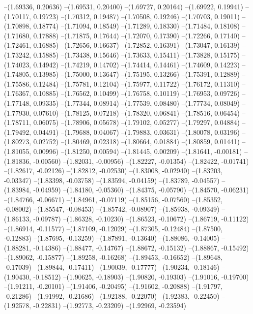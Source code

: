 --(1.69336, 0.20636)
--(1.69531, 0.20400)
--(1.69727, 0.20164)
--(1.69922, 0.19941)
--(1.70117, 0.19723)
--(1.70312, 0.19487)
--(1.70508, 0.19246)
--(1.70703, 0.19011)
--(1.70898, 0.18774)
--(1.71094, 0.18549)
--(1.71289, 0.18330)
--(1.71484, 0.18108)
--(1.71680, 0.17888)
--(1.71875, 0.17644)
--(1.72070, 0.17390)
--(1.72266, 0.17140)
--(1.72461, 0.16885)
--(1.72656, 0.16637)
--(1.72852, 0.16391)
--(1.73047, 0.16139)
--(1.73242, 0.15885)
--(1.73438, 0.15646)
--(1.73633, 0.15411)
--(1.73828, 0.15175)
--(1.74023, 0.14942)
--(1.74219, 0.14702)
--(1.74414, 0.14461)
--(1.74609, 0.14223)
--(1.74805, 0.13985)
--(1.75000, 0.13647)
--(1.75195, 0.13266)
--(1.75391, 0.12889)
--(1.75586, 0.12484)
--(1.75781, 0.12104)
--(1.75977, 0.11722)
--(1.76172, 0.11310)
--(1.76367, 0.10885)
--(1.76562, 0.10499)
--(1.76758, 0.10119)
--(1.76953, 0.09726)
--(1.77148, 0.09335)
--(1.77344, 0.08914)
--(1.77539, 0.08480)
--(1.77734, 0.08049)
--(1.77930, 0.07610)
--(1.78125, 0.07218)
--(1.78320, 0.06841)
--(1.78516, 0.06454)
--(1.78711, 0.06075)
--(1.78906, 0.05678)
--(1.79102, 0.05277)
--(1.79297, 0.04884)
--(1.79492, 0.04491)
--(1.79688, 0.04067)
--(1.79883, 0.03631)
--(1.80078, 0.03196)
--(1.80273, 0.02752)
--(1.80469, 0.02318)
--(1.80664, 0.01884)
--(1.80859, 0.01441)
--(1.81055, 0.00996)
--(1.81250, 0.00594)
--(1.81445, 0.00209)
--(1.81641, -0.00181)
--(1.81836, -0.00560)
--(1.82031, -0.00956)
--(1.82227, -0.01354)
--(1.82422, -0.01741)
--(1.82617, -0.02126)
--(1.82812, -0.02530)
--(1.83008, -0.02940)
--(1.83203, -0.03347)
--(1.83398, -0.03758)
--(1.83594, -0.04159)
--(1.83789, -0.04557)
--(1.83984, -0.04959)
--(1.84180, -0.05360)
--(1.84375, -0.05790)
--(1.84570, -0.06231)
--(1.84766, -0.06671)
--(1.84961, -0.07119)
--(1.85156, -0.07560)
--(1.85352, -0.08002)
--(1.85547, -0.08453)
--(1.85742, -0.08907)
--(1.85938, -0.09349)
--(1.86133, -0.09787)
--(1.86328, -0.10230)
--(1.86523, -0.10672)
--(1.86719, -0.11122)
--(1.86914, -0.11577)
--(1.87109, -0.12029)
--(1.87305, -0.12484)
--(1.87500, -0.12883)
--(1.87695, -0.13259)
--(1.87891, -0.13640)
--(1.88086, -0.14005)
--(1.88281, -0.14386)
--(1.88477, -0.14767)
--(1.88672, -0.15132)
--(1.88867, -0.15492)
--(1.89062, -0.15877)
--(1.89258, -0.16268)
--(1.89453, -0.16652)
--(1.89648, -0.17039)
--(1.89844, -0.17411)
--(1.90039, -0.17777)
--(1.90234, -0.18146)
--(1.90430, -0.18512)
--(1.90625, -0.18903)
--(1.90820, -0.19303)
--(1.91016, -0.19700)
--(1.91211, -0.20101)
--(1.91406, -0.20495)
--(1.91602, -0.20888)
--(1.91797, -0.21286)
--(1.91992, -0.21686)
--(1.92188, -0.22070)
--(1.92383, -0.22450)
--(1.92578, -0.22831)
--(1.92773, -0.23209)
--(1.92969, -0.23594)
